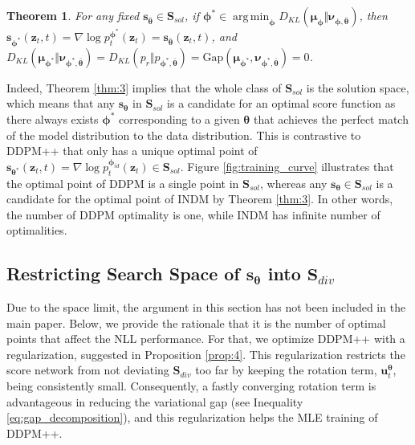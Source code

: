 \documentclass{article}
\newtheorem{theorem}{Theorem}\newtheorem{proposition}{Proposition}
\theoremstyle{definition}
\theoremstyle{remark}
\DeclareMathOperator*{\argmin}{arg\,min}
\begin{document}
	\begingroup
	\renewcommand\thetheorem{3}
	\begin{theorem}
		For any fixed $\mathbf{s}_{\bm{\bar{\theta}}}\in\mathbf{S}_{sol}$, if $\bm{\phi}^{*}\in\argmin_{\bm{\phi}}{D_{KL}(\bm{\mu}_{\bm{\phi}}\Vert \bm{\nu}_{\bm{\phi},\bm{\bar{\theta}}})}$, then $\mathbf{s}_{\bm{\phi}^{*}}(\mathbf{z}_{t},t)=\nabla\log{p_{t}^{\bm{\phi}^{*}}(\mathbf{z}_{t})}=\mathbf{s}_{\bm{\bar{\theta}}}(\mathbf{z}_{t},t)$, and $D_{KL}(\bm{\mu}_{\bm{\phi}^{*}}\Vert \bm{\nu}_{\bm{\phi}^{*},\bm{\bar{\theta}}})=D_{KL}(p_{r}\Vert p_{\bm{\phi}^{*},\bm{\bar{\theta}}})=\text{Gap}(\bm{\mu}_{\bm{\phi}^{*}},\bm{\nu}_{\bm{\phi}^{*},\bm{\bar{\theta}}})=0$.
	\end{theorem}
	\endgroup
	
	Indeed, Theorem \ref{thm:3} implies that the whole class of $\mathbf{S}_{sol}$ is the solution space, which means that any $\mathbf{s}_{\bm{\theta}}$ in $\mathbf{S}_{sol}$ is a candidate for an optimal score function as there always exists $\bm{\phi}^{*}$ corresponding to a given $\bm{\theta}$ that achieves the perfect match of the model distribution to the data distribution. This is contrastive to DDPM++ that only has a unique optimal point of $\mathbf{s}_{\bm{\theta}^{*}}(\mathbf{z}_{t},t)=\nabla\log{p_{t}^{\bm{\phi}_{id}}(\mathbf{z}_{t})}\in\mathbf{S}_{sol}$. Figure \ref{fig:training_curve} illustrates that the optimal point of DDPM is a single point in $\mathbf{S}_{sol}$, whereas any $\mathbf{s}_{\bm{\theta}}\in\mathbf{S}_{sol}$ is a candidate for the optimal point of INDM by Theorem \ref{thm:3}. In other words, the number of DDPM optimality is one, while INDM has infinite number of optimalities.
	
	\subsection{Restricting Search Space of \texorpdfstring{$\mathbf{s}_{\bm{\theta}}$}{TEXT} into \texorpdfstring{$\mathbf{S}_{div}$}{TEXT}}\label{appendix:regularization}
	
	Due to the space limit, the argument in this section has not been included in the main paper. Below, we provide the rationale that it is the number of optimal points that affect the NLL performance. For that, we optimize DDPM++ with a regularization, suggested in Proposition \ref{prop:4}. This regularization restricts the score network from not deviating $\mathbf{S}_{div}$ too far by keeping the rotation term, $\mathbf{u}_{t}^{\bm{\theta}}$, being consistently small. Consequently, a fastly converging rotation term is advantageous in reducing the variational gap (see Inequality \eqref{eq:gap_decomposition}), and this regularization helps the MLE training of DDPM++. 
	
\end{document}
